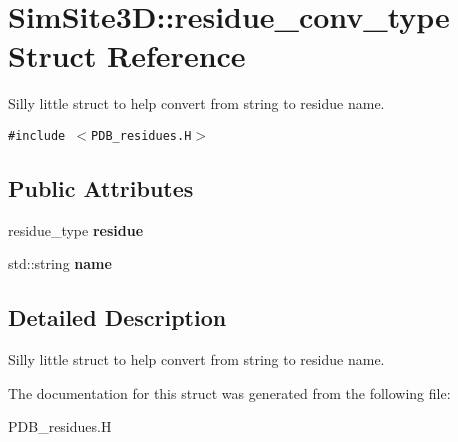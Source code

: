 \section{SimSite3D::residue\_\-conv\_\-type Struct Reference}
\label{structSimSite3D_1_1residue__conv__type}
Silly little struct to help convert from string to residue name.  


{\tt \#include $<$PDB\_\-residues.H$>$}

\subsection*{Public Attributes}
\begin{CompactItemize}
\item 
residue\_\-type \textbf{residue}\label{structSimSite3D_1_1residue__conv__type_52f8acfdb1c1877592360527484b7da6}

\item 
std::string \textbf{name}\label{structSimSite3D_1_1residue__conv__type_a282bb2bec2f7ed9e2786ba3a5ac443b}

\end{CompactItemize}


\subsection{Detailed Description}
Silly little struct to help convert from string to residue name. 



The documentation for this struct was generated from the following file:\begin{CompactItemize}
\item 
PDB\_\-residues.H\end{CompactItemize}
